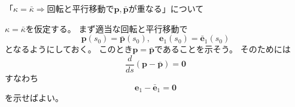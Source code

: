 \documentclass[a4j,disablejfam,dvipdfmx,papersize,slide,uplatex,21pt]{jsarticle}
\makeatletter
\renewenvironment{proof}[1][\proofname]{\par
        \pushQED{\qed}
        \normalfont
        \topsep6\p@\@plus6\p@ \trivlist
        \item[\hskip\labelsep{\bfseries #1}\@addpunct{\bfseries}]\ignorespaces
    }{%
        \popQED\endtrivlist\@endpefalse
    }
\renewcommand{\proofname}{証明.}
\makeatother
\begin{document}
\begin{proof}
    \newpage
    「$\kappa = \bar{\kappa} \Rightarrow \text{回転と平行移動で$\bm{p}, \bar{\bm{p}}$が重なる}$」について

    $\kappa = \bar{\kappa}$を仮定する。
    まず適当な回転と平行移動で
    \begin{equation}
        \bm{p}(s_0) = \bar{\bm{p}}(s_0), \quad
        \bm{e}_1(s_0) = \bar{\bm{e}}_1(s_0)
    \end{equation}
    となるようにしておく。
    このとき$\bm{p} = \bar{\bm{p}}$であることを示そう。
    そのためには
    \begin{equation}
        \frac{d}{ds} (\bm{p} - \bar{\bm{p}}) = \bm{0}
    \end{equation}
    すなわち
    \begin{equation}
        \bm{e}_1 - \bar{\bm{e}}_1 = \bm{0}
    \end{equation}
    を示せばよい。


\end{proof}
\end{document}
